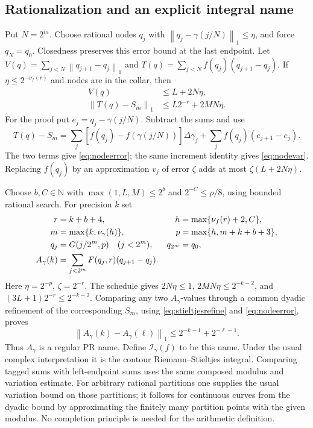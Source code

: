 \documentclass[11pt]{article}
\theoremstyle{definition}
\newcommand{\N}{\mathbb N}
\newcommand{\norm}[1]{\left\lVert#1\right\rVert_1}
\newcommand{\Int}{\mathcal I}
\begin{document}
\subsection{Rationalization and an explicit integral name}

Put \(N=2^m\). Choose rational nodes \(q_j\) with
\(\norm{q_j-\gamma(j/N)}\le\eta\), and force \(q_N=q_0\).
Closedness preserves this error bound at the last endpoint. Let
\(V(q)=\sum_{j<N}\norm{q_{j+1}-q_j}\) and
\(T(q)=\sum_{j<N}f(q_j)(q_{j+1}-q_j)\).
If \(\eta\le2^{-\nu_f(r)}\) and nodes are in the collar, then
\begin{align}
 V(q)&\le L+2N\eta,\label{eq:nodevar}\\
 \norm{T(q)-S_m}&\le L2^{-r}+2MN\eta.\label{eq:nodeerror}
\end{align}
For the proof put \(e_j=q_j-\gamma(j/N)\). Subtract the sums and use
\[
 T(q)-S_m=\sum_j[f(q_j)-f(\gamma(j/N))]\Delta\gamma_j
              +\sum_j f(q_j)(e_{j+1}-e_j).
\]
The two terms give \eqref{eq:nodeerror}; the same increment identity
gives \eqref{eq:nodevar}. Replacing \(f(q_j)\) by an approximation
\(v_j\) of error \(\zeta\) adds at most \(\zeta(L+2N\eta)\).

Choose \(b,C\in\N\) with
\(\max(1,L,M)\le2^b\) and \(2^{-C}\le\rho/8\), using bounded rational
search. For precision \(k\) set
\begin{align}
 r&=k+b+4, &h&=\max\{\nu_f(r)+2,C\},\notag\\
 m&=\max\{k,\nu_\gamma(h)\}, &
 p&=\max\{h,m+k+b+3\},\notag\\
 q_j&=G(j/2^m,p)\quad(j<2^m), &q_{2^m}&=q_0,\notag\\
 A_\gamma(k)&=\sum_{j<2^m}F(q_j,r)(q_{j+1}-q_j).
       \label{eq:curvealgorithm}
\end{align}
Here \(\eta=2^{-p}\), \(\zeta=2^{-r}\). The schedule gives
\(2N\eta\le1\), \(2MN\eta\le2^{-k-2}\), and
\((3L+1)2^{-r}\le2^{-k-2}\).
Comparing any two \(A_\gamma\)-values through a common dyadic refinement
of the corresponding \(S_m\), using \eqref{eq:stieltjesrefine} and
\eqref{eq:nodeerror}, proves
\[
 \norm{A_\gamma(k)-A_\gamma(\ell)}
       \le2^{-k-1}+2^{-\ell-1}.
\]
Thus \(A_\gamma\) is a regular PR name. Define
\(\Int_\gamma(f)\) to be this name. Under the usual complex
interpretation it is the contour Riemann--Stieltjes integral. Comparing
tagged sums with left-endpoint sums uses the same composed modulus and
variation estimate. For arbitrary rational partitions one supplies the
usual variation bound on those partitions; it follows for continuous
curves from the dyadic bound by approximating the finitely many partition
points with the given modulus. No completion principle is needed for
the arithmetic definition.
\end{document}
